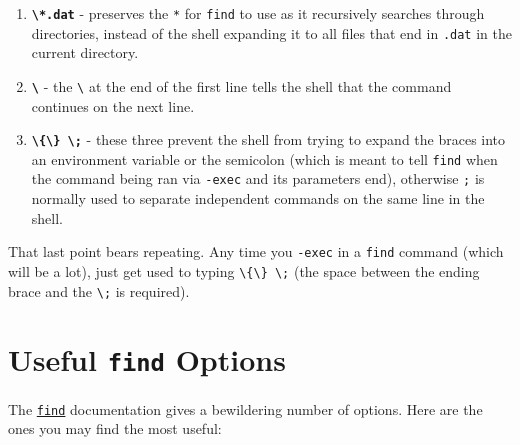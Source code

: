 \documentclass[10pt,]{book}
\numberwithin{figure}{chapter}
\begin{document}
\begin{enumerate}
\def\labelenumi{\arabic{enumi}.}
\item
  \textbf{\texttt{\textbackslash{}*.dat}} - preserves the \texttt{*} for
  \texttt{find} to use as it recursively searches through directories,
  instead of the shell expanding it to all files that end in
  \texttt{.dat} in the current directory.
\item
  \textbf{\texttt{\textbackslash{}}} - the \texttt{\textbackslash{}} at
  the end of the first line tells the shell that the command continues
  on the next line.
\item
  \textbf{\texttt{\textbackslash{}\{\textbackslash{}\} \textbackslash{};}}
  - these three prevent the shell from trying to expand the braces into
  an environment variable or the semicolon (which is meant to tell
  \texttt{find} when the command being ran via \texttt{-exec} and its
  parameters end), otherwise \texttt{;} is normally used to separate
  independent commands on the same line in the shell.
\end{enumerate}

That last point bears repeating. Any time you \texttt{-exec} in a
\texttt{find} command (which will be a lot), just get used to typing
\texttt{\textbackslash{}\{\textbackslash{}\} \textbackslash{};} (the
space between the ending brace and the \texttt{\textbackslash{};} is
required).

\section{Useful \texttt{find} Options}\label{useful-find-options}

The \href{http://linux.die.net/man/1/find}{\texttt{find}} documentation
gives a bewildering number of options. Here are the ones you may find
the most useful:
\end{document}
